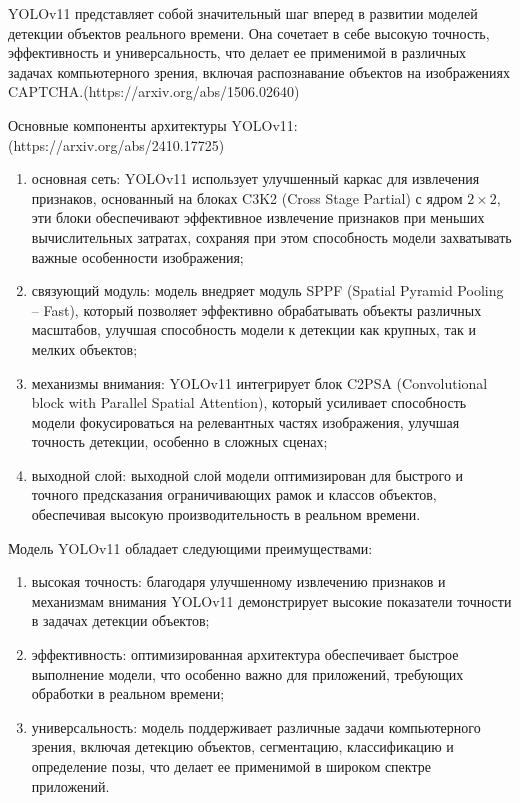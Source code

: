 YOLOv11 представляет собой значительный шаг вперед в развитии моделей детекции 
объектов реального времени. Она сочетает в себе высокую точность, эффективность и 
универсальность, что делает ее применимой в различных задачах компьютерного 
зрения, включая распознавание объектов на изображениях CAPTCHA.(https://arxiv.org/abs/1506.02640)

Основные компоненты архитектуры YOLOv11:(https://arxiv.org/abs/2410.17725)

\begin{enumerate}
    \item основная сеть: YOLOv11 использует улучшенный каркас для извлечения 
    признаков, основанный на блоках C3K2 (Cross Stage Partial) с ядром 
    $2\times2$, эти блоки обеспечивают эффективное извлечение признаков при 
    меньших вычислительных затратах, сохраняя при этом способность модели 
    захватывать важные особенности изображения;
    \item связующий модуль: модель внедряет модуль SPPF (Spatial Pyramid 
    Pooling -- Fast), который позволяет эффективно обрабатывать объекты различных 
    масштабов, улучшая способность модели к детекции как крупных, так и мелких 
    объектов;
    \item механизмы внимания: YOLOv11 интегрирует блок C2PSA (Convolutional block 
    with Parallel Spatial Attention), который усиливает способность модели 
    фокусироваться на релевантных частях изображения, улучшая точность детекции, 
    особенно в сложных сценах;
    \item выходной слой: выходной слой модели оптимизирован для быстрого и точного 
    предсказания ограничивающих рамок и классов объектов, обеспечивая 
    высокую производительность в реальном времени.
\end{enumerate}

Модель YOLOv11 обладает следующими преимуществами:

\begin{enumerate}
    \item высокая точность: благодаря улучшенному извлечению признаков и 
    механизмам внимания YOLOv11 демонстрирует высокие показатели точности в 
    задачах детекции объектов;
    \item эффективность: оптимизированная архитектура обеспечивает быстрое 
    выполнение модели, что особенно важно для приложений, требующих обработки в 
    реальном времени;
    \item универсальность: модель поддерживает различные задачи компьютерного 
    зрения, включая детекцию объектов, сегментацию, классификацию и определение 
    позы, что делает ее применимой в широком спектре приложений.
\end{enumerate}


